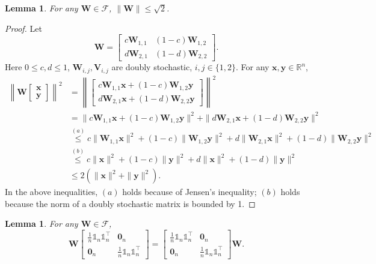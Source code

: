 \documentclass{article}
\newcommand{\vx}{\mathbf{x}}
\newcommand{\vy}{\mathbf{y}}
\newcommand{\vzero}{\mathbf{0}}
\newcommand{\vV}{\mathbf{V}}
\newcommand{\vW}{\mathbf{W}}
\newcommand{\bbR}{\mathbb{R}}
\newcommand{\bbone}{\mathds{1}}
\theoremstyle{plain}
\newtheorem{lemma}[theorem]{Lemma}
\theoremstyle{definition}
\begin{document}
\begin{lemma}
\label{lem:F-matrix-upper-bound}
For any $\vW\in\mathscr{F}$, $\|\vW\|\leq \sqrt 2$.
\end{lemma}
\begin{proof}
Let
$$\vW=\left[
\begin{array}{cc}
    c \vW_{1,1} & (1-c)\vW_{1,2} \\
    d\vW_{2,1} & (1-d)\vW_{2,2} 
\end{array}
\right].$$
{Here $0\leq c,d \leq 1$, $\vW_{i,j}, \vV_{i,j}$ are doubly stochastic, $i,j\in\{1,2\}$.}
For any $\vx,\vy\in\bbR^n$,
\begin{align*}
\left\|\vW\left[
\begin{array}{c}
     \vx  \\
     \vy
\end{array}
\right]\right\|^2&=\left\|
\left[
\begin{array}{c}
    c \vW_{1,1}\vx+(1-c)\vW_{1,2}\vy \\
    d\vW_{2,1}\vx+ (1-d)\vW_{2,2}\vy 
\end{array}
\right]
\right\|^2\\
&=\|c \vW_{1,1}\vx+(1-c)\vW_{1,2}\vy\|^2+\|d\vW_{2,1}\vx+ (1-d)\vW_{2,2}\vy \|^2\\
&\stackrel{(a)}{\leq} c \|\vW_{1,1}\vx \|^2+(1-c)\|\vW_{1,2}\vy\|^2+d\|\vW_{2,1}\vx\|^2+ (1-d)\|\vW_{2,2}\vy \|^2\\
&\stackrel{(b)}{\leq}c\|\vx\|^2+(1-c)\|\vy\|^2+d\|\vx\|^2+ (1-d)\|\vy \|^2\\
&\leq 2(\|\vx\|^2+\|\vy\|^2).
\end{align*}
In the above inequalities, $(a)$ holds because of Jensen's inequality; $(b)$ holds because the norm of a doubly stochastic matrix is bounded by 1.
\end{proof}
\begin{lemma}
\label{lem:commutativity}
For any $\vW\in\mathscr{F}$,
\begin{equation*}
\vW
\left[
\begin{array}{cc}
    \frac{1}{n}\bbone_n\bbone_n^\top & \vzero_n \\
    \vzero_n & \frac{1}{n}\bbone_n\bbone_n^\top
\end{array}
\right]
=
\left[
\begin{array}{cc}
    \frac{1}{n}\bbone_n\bbone_n^\top & \vzero_n \\
    \vzero_n & \frac{1}{n}\bbone_n\bbone_n^\top
\end{array}
\right]
\vW.
\end{equation*}
\end{lemma}
\end{document}
